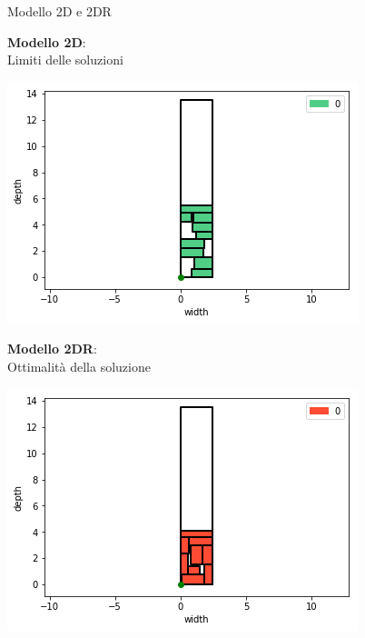 \documentclass{beamer}
\begin{document}
\begin{frame}{Modello 2D e 2DR}
								
	\begin{minipage}[c]{0.45\textwidth}
		\textbf{Modello 2D}:\\Limiti delle soluzioni
	\end{minipage}
	\hfill
	\begin{minipage}[c]{0.45\textwidth}
		\includegraphics[width=1\linewidth]{figures/general2D}
	\end{minipage}
						
	\begin{minipage}[c]{0.45\textwidth}
		\textbf{Modello 2DR}:\\Ottimalit\`a della soluzione
	\end{minipage}
	\hfill
	\begin{minipage}[c]{0.45\textwidth}
		\includegraphics[width=1\linewidth]{figures/general2DR}
	\end{minipage}
\end{frame}
\end{document}
